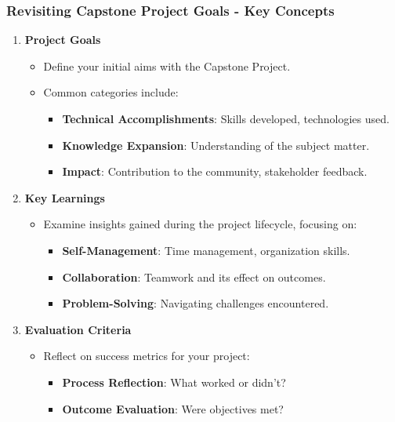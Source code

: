 \documentclass[aspectratio=169]{beamer}
\begin{document}
\begin{frame}[fragile]
    \frametitle{Revisiting Capstone Project Goals - Key Concepts}
    \begin{enumerate}
        \item \textbf{Project Goals}
        \begin{itemize}
            \item Define your initial aims with the Capstone Project.
            \item Common categories include:
            \begin{itemize}
                \item \textbf{Technical Accomplishments}: Skills developed, technologies used.
                \item \textbf{Knowledge Expansion}: Understanding of the subject matter.
                \item \textbf{Impact}: Contribution to the community, stakeholder feedback.
            \end{itemize}
        \end{itemize}
        
        \item \textbf{Key Learnings}
        \begin{itemize}
            \item Examine insights gained during the project lifecycle, focusing on:
            \begin{itemize}
                \item \textbf{Self-Management}: Time management, organization skills.
                \item \textbf{Collaboration}: Teamwork and its effect on outcomes.
                \item \textbf{Problem-Solving}: Navigating challenges encountered.
            \end{itemize}
        \end{itemize}

        \item \textbf{Evaluation Criteria}
        \begin{itemize}
            \item Reflect on success metrics for your project:
            \begin{itemize}
                \item \textbf{Process Reflection}: What worked or didn’t?
                \item \textbf{Outcome Evaluation}: Were objectives met?
            \end{itemize}
        \end{itemize}
    \end{enumerate}
\end{frame}
\end{document}
